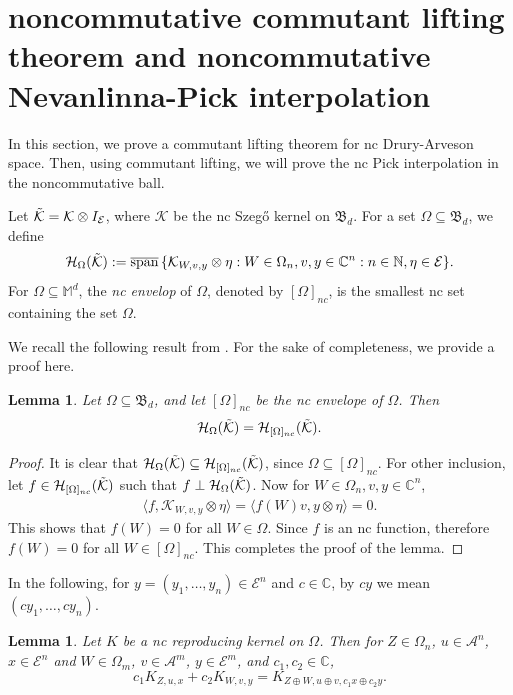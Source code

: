 \documentclass[12pt]{amsart}%
\newtheorem{lemma}[theorem]{Lemma}
\numberwithin{equation}{section}
\newcommand{\bM}{\mathbb{M}}
\newcommand{\fB}{{\mathfrak{B}}}
\newcommand{\cla}{\mathcal{A}}
\newcommand{\cle}{\mathcal{E}}
\newcommand{\clh}{\mathcal{H}}
\newcommand{\clk}{\mathcal{K}}
\newcommand{\C}{\mathbb{C}}
\newcommand\la{{\langle }}
\newcommand\ra{{\rangle}}
\begin{document}
\section{noncommutative commutant lifting theorem and noncommutative Nevanlinna-Pick interpolation}\label{lifting and interpolation}
In this section, we prove a commutant lifting theorem for nc Drury-Arveson space. Then, using commutant lifting, we will prove the nc Pick interpolation in the noncommutative ball.

Let $\Tilde{\clk}=\clk \otimes I_\cle$, where $\clk$ be the nc Szeg\H o kernel on $\fB_d$.
For a set $\Omega\subseteq \fB_d$, we define
\[\clh_\Omega(\Tilde{\clk}):=\overline{\text{span}}\,\{ \clk_{W, v, y}\otimes \eta : W\in \Omega_n, v, y\in \C^n: n\in \mathbb{N}, \eta \in \cle\}.\]
For $\Omega\subseteq \bM^d$, the \textit{nc envelop} of $\Omega$, denoted by $[\Omega]_{nc}$, is the smallest nc set containing the set $\Omega$.

We recall the following result from \cite{SSS}. For the sake of completeness, we provide a proof here.
\begin{lemma}\label{RKHS_full nc}
Let $\Omega\subseteq \fB_d$, and let $[\Omega]_{nc}$ be the nc envelope of $\Omega$. Then
\[\clh_\Omega(\Tilde{\clk})= \clh_{[\Omega]_{nc}}(\Tilde{\clk}).\]
\end{lemma}
\begin{proof}
 It is clear that $\clh_\Omega(\Tilde{\clk})\subseteq \clh_{[\Omega]_{nc}}(\Tilde{\clk})$, since $\Omega\subseteq [\Omega]_{nc}$. For other inclusion, let $f\in \clh_{[\Omega]_{nc}}(\Tilde{\clk}) $ such that $f\perp \clh_\Omega(\Tilde{\clk})$. Now for $W\in \Omega_n, v, y\in \C^n$, 
\begin{align*}
\la f, \clk_{W, v, y}\otimes \eta\ra =\la f(W)v, y\otimes \eta\ra=0.
\end{align*}
This shows that $f(W)=0$ for all $W\in \Omega$. Since $f$ is an nc function, therefore $f(W)=0$ for all $W\in [\Omega]_{nc}$. This completes the proof of the lemma.
\end{proof}

In the following, for $y=(y_1, \ldots, y_n)\in \cle^n$ and $c\in \C$, by $cy$ we mean $(cy_1, \ldots, cy_n)$.

\begin{lemma}\label{sum of nc kernel at points}
Let $K$ be a nc reproducing kernel on $\Omega$. Then
for $Z\in \Omega_n$, $u\in \cla^n$,  $x\in \cle^n$ and $W \in \Omega_m$, $v\in \cla^m$, $ y\in \cle^m$, and $c_1, c_2\in \C$, 
\[c_1K_{Z, u,x}+ c_2 K_{W, v, y}=K_{ Z\oplus W, u\oplus v, c_1x\oplus c_2y}.\]
\end{lemma}
\end{document}
